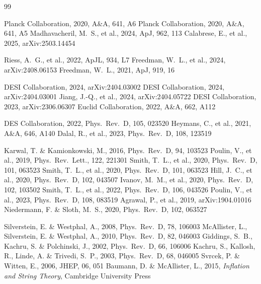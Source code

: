 \documentclass[a4paper,11pt]{article}
\begin{document}
\begin{thebibliography}{99}

 Planck Collaboration, 2020, A\&A, 641, A6
 Planck Collaboration, 2020, A\&A, 641, A5
 Madhavacheril, M.~S., et al., 2024, ApJ, 962, 113
 Calabrese, E., et al., 2025, arXiv:2503.14454

 Riess, A.~G., et al., 2022, ApJL, 934, L7
 Freedman, W.~L., et al., 2024, arXiv:2408.06153
 Freedman, W.~L., 2021, ApJ, 919, 16

 DESI Collaboration, 2024, arXiv:2404.03002
 DESI Collaboration, 2024, arXiv:2404.03001
 Jiang, J.-Q., et al., 2024, arXiv:2404.05722
 DESI Collaboration, 2023, arXiv:2306.06307
 Euclid Collaboration, 2022, A\&A, 662, A112

 DES Collaboration, 2022, Phys.\ Rev.\ D, 105, 023520
 Heymans, C., et al., 2021, A\&A, 646, A140
 Dalal, R., et al., 2023, Phys.\ Rev.\ D, 108, 123519

 Karwal, T. \& Kamionkowski, M., 2016, Phys.\ Rev.\ D, 94, 103523
 Poulin, V., et al., 2019, Phys.\ Rev.\ Lett., 122, 221301
 Smith, T.~L., et al., 2020, Phys.\ Rev.\ D, 101, 063523
 Smith, T.~L., et al., 2020, Phys.\ Rev.\ D, 101, 063523  %
 Hill, J.~C., et al., 2020, Phys.\ Rev.\ D, 102, 043507
 Ivanov, M.~M., et al., 2020, Phys.\ Rev.\ D, 102, 103502
 Smith, T.~L., et al., 2022, Phys.\ Rev.\ D, 106, 043526
 Poulin, V., et al., 2023, Phys.\ Rev.\ D, 108, 083519
 Agrawal, P., et al., 2019, arXiv:1904.01016
 Niedermann, F. \& Sloth, M.~S., 2020, Phys.\ Rev.\ D, 102, 063527

 Silverstein, E. \& Westphal, A., 2008, Phys.\ Rev.\ D, 78, 106003
 McAllister, L., Silverstein, E. \& Westphal, A., 2010, Phys.\ Rev.\ D, 82, 046003
 Giddings, S.~B., Kachru, S. \& Polchinski, J., 2002, Phys.\ Rev.\ D, 66, 106006
 Kachru, S., Kallosh, R., Linde, A. \& Trivedi, S.~P., 2003, Phys.\ Rev.\ D, 68, 046005
 Svrcek, P. \& Witten, E., 2006, JHEP, 06, 051
 Baumann, D. \& McAllister, L., 2015, \textit{Inflation and String Theory}, Cambridge University Press


\end{thebibliography}
\end{document}
